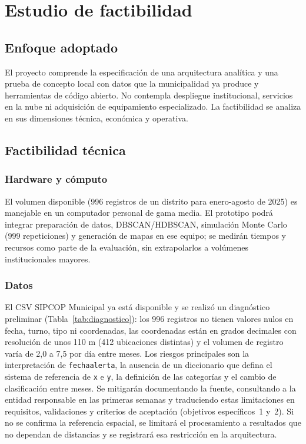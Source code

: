 \chapter{Estudio de factibilidad}

\section{Enfoque adoptado}

El proyecto comprende la especificación de una arquitectura analítica y una prueba de concepto local con datos que la municipalidad ya produce y herramientas de código abierto. No contempla despliegue institucional, servicios en la nube ni adquisición de equipamiento especializado. La factibilidad se analiza en sus dimensiones técnica, económica y operativa.

\section{Factibilidad técnica}

\subsection{Hardware y cómputo}

El volumen disponible (996 registros de un distrito para enero-agosto de 2025) es manejable en un computador personal de gama media. El prototipo podrá integrar preparación de datos, DBSCAN/HDBSCAN, simulación Monte Carlo (999 repeticiones) y generación de mapas en ese equipo; se medirán tiempos y recursos como parte de la evaluación, sin extrapolarlos a volúmenes institucionales mayores.

\subsection{Datos}

El CSV SIPCOP Municipal ya está disponible y se realizó un diagnóstico preliminar (Tabla~\ref{tab:diagnostico}): los 996 registros no tienen valores nulos en fecha, turno, tipo ni coordenadas, las coordenadas están en grados decimales con resolución de unos 110 m (412 ubicaciones distintas) y el volumen de registro varía de 2,0 a 7,5 por día entre meses. Los riesgos principales son la interpretación de \texttt{fechaalerta}, la ausencia de un diccionario que defina el sistema de referencia de \texttt{x} e \texttt{y}, la definición de las categorías y el cambio de clasificación entre meses. Se mitigarán documentando la fuente, consultando a la entidad responsable en las primeras semanas y traduciendo estas limitaciones en requisitos, validaciones y criterios de aceptación (objetivos específicos~1 y~2). Si no se confirma la referencia espacial, se limitará el procesamiento a resultados que no dependan de distancias y se registrará esa restricción en la arquitectura.

